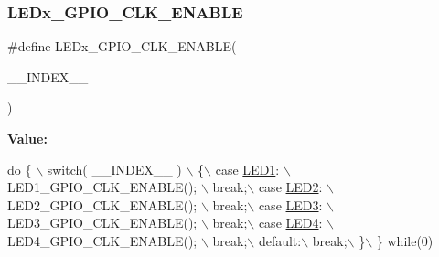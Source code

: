 \subsubsection{\texorpdfstring{L\+E\+Dx\+\_\+\+G\+P\+I\+O\+\_\+\+C\+L\+K\+\_\+\+E\+N\+A\+B\+LE}{LEDx\_GPIO\_CLK\_ENABLE}}
{\footnotesize\ttfamily \#define L\+E\+Dx\+\_\+\+G\+P\+I\+O\+\_\+\+C\+L\+K\+\_\+\+E\+N\+A\+B\+LE(\begin{DoxyParamCaption}\item[{}]{\+\_\+\+\_\+\+I\+N\+D\+E\+X\+\_\+\+\_\+ }\end{DoxyParamCaption})}

{\bfseries Value\+:}
\begin{DoxyCode}
\textcolor{keywordflow}{do} \{ \(\backslash\)
                                                switch( \_\_INDEX\_\_ ) \(\backslash\)
                                                \{\(\backslash\)
                                                  case \hyperlink{group__B-L072Z-LRWAN1__LOW__LEVEL__Exported__Types_ggaa059704b7ca945eb9c1e7f2c3d03fecdadac6477842247cab1a8c02c65f431b44}{LED1}: \(\backslash\)
                                                    LED1\_GPIO\_CLK\_ENABLE();   \(\backslash\)
                                                    break;\(\backslash\)
                                                  case \hyperlink{group__B-L072Z-LRWAN1__LOW__LEVEL__Exported__Types_ggaa059704b7ca945eb9c1e7f2c3d03fecda8379bbaa96d151e6adac488b2a147b7a}{LED2}: \(\backslash\)
                                                    LED2\_GPIO\_CLK\_ENABLE();   \(\backslash\)
                                                    break;\(\backslash\)
                                                  case \hyperlink{group__B-L072Z-LRWAN1__LOW__LEVEL__Exported__Types_ggaa059704b7ca945eb9c1e7f2c3d03fecda5dec293e081e0fc78369c842fab8452b}{LED3}: \(\backslash\)
                                                    LED3\_GPIO\_CLK\_ENABLE();   \(\backslash\)
                                                    break;\(\backslash\)
                                                  case \hyperlink{group__B-L072Z-LRWAN1__LOW__LEVEL__Exported__Types_ggaa059704b7ca945eb9c1e7f2c3d03fecdad60e39b8d1701d30aa64f80343217342}{LED4}: \(\backslash\)
                                                    LED4\_GPIO\_CLK\_ENABLE();   \(\backslash\)
                                                    break;\(\backslash\)
                                                  default:\(\backslash\)
                                                    break;\(\backslash\)
                                                \}\(\backslash\)
                                              \} \textcolor{keywordflow}{while}(0)
\end{DoxyCode}
